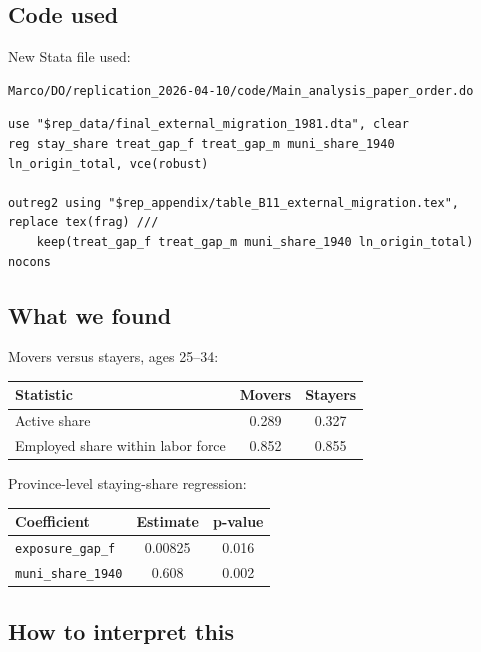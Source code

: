 \documentclass[11pt]{article}
\begin{document}
\subsection*{Code used}

New Stata file used:

\begin{verbatim}
Marco/DO/replication_2026-04-10/code/Main_analysis_paper_order.do
\end{verbatim}

\begin{verbatim}
use "$rep_data/final_external_migration_1981.dta", clear
reg stay_share treat_gap_f treat_gap_m muni_share_1940 ln_origin_total, vce(robust)

outreg2 using "$rep_appendix/table_B11_external_migration.tex", replace tex(frag) ///
    keep(treat_gap_f treat_gap_m muni_share_1940 ln_origin_total) nocons
\end{verbatim}

\subsection*{What we found}

Movers versus stayers, ages 25--34:

\begin{center}
\begin{tabular}{lcc}
\toprule
Statistic & Movers & Stayers \\
\midrule
Active share & 0.289 & 0.327 \\
Employed share within labor force & 0.852 & 0.855 \\
\bottomrule
\end{tabular}
\end{center}

Province-level staying-share regression:

\begin{center}
\begin{tabular}{lcc}
\toprule
Coefficient & Estimate & p-value \\
\midrule
\texttt{exposure\_gap\_f} & 0.00825 & 0.016 \\
\texttt{muni\_share\_1940} & 0.608 & 0.002 \\
\bottomrule
\end{tabular}
\end{center}

\subsection*{How to interpret this}
\end{document}
